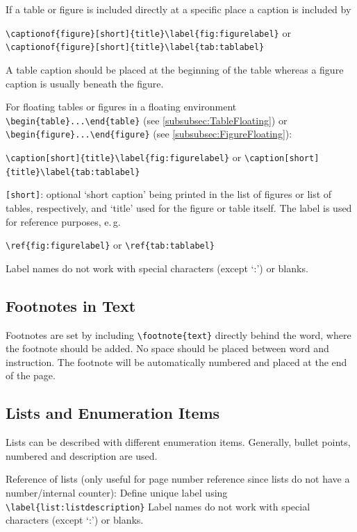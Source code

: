 \documentclass{pharmrep}
\newcommand{\eg}{e.\,g.\xspace}
\begin{document}
If a table or figure is included directly at a specific place a caption is included by

\verb|\captionof{figure}[short]{title}\label{fig:figurelabel}| or \newline
\verb|\captionof{figure}[short]{title}\label{tab:tablabel}|

A table caption should be placed at the beginning of the table whereas a figure caption is usually
beneath the figure.

For floating tables or figures in a floating environment \verb|\begin{table}...\end{table}| (see
\ref{subsubsec:TableFloating}) or \verb|\begin{figure}...\end{figure}| (see \ref{subsubsec:FigureFloating}):

\verb|\caption[short]{title}\label{fig:figurelabel}| or \newline
\verb|\caption[short]{title}\label{tab:tablabel}|

\verb|[short]|: optional `short caption' being printed in the list of figures or list of tables, respectively,
and `title' used for the figure or table itself. The label is used for reference purposes, \eg

\verb|\ref{fig:figurelabel}| or \verb|\ref{tab:tablabel}|

Label names do not work with special characters (except `:') or blanks.

\subsection{Footnotes in Text}
Footnotes are set by including \verb|\footnote{text}| directly behind the word, where the footnote
should be added. No space should be placed between word and instruction. The footnote will be
automatically numbered and placed at the end of the page.

\subsection{Lists and Enumeration Items}
Lists can be described with different enumeration items. Generally, bullet points, numbered and
description are used.

Reference of lists (only useful for page number reference since lists do not have a number/internal
counter):
Define unique label using\newline
\verb|\label{list:listdescription}| \newline
Label names do not work with special characters (except `:') or blanks.
\end{document}
